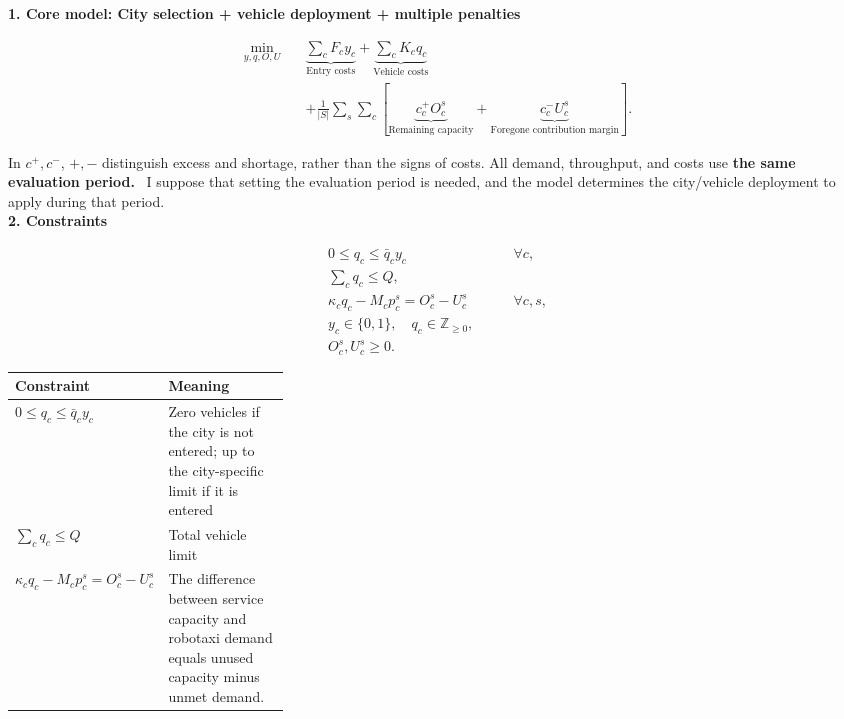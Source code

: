 \documentclass[10pt,a4paper]{article}
\newcommand{\hd}[1]{\par\vspace{8pt}\textbf{#1}\par\vspace{3pt}}
\newcommand{\note}{\textreferencemark\ }
\newcommand{\under}[2]{\underbrace{#1}_{\text{#2}}}
\begin{document}
\hd{1. Core model: City selection + vehicle deployment + multiple penalties}

\[
\boxed{\begin{aligned}
\min_{y,q,O,U}\quad
&\under{\sum_c F_c y_c}{Entry costs}
+\under{\sum_c K_c q_c}{Vehicle costs}\\
&+\frac{1}{|S|}\sum_s\sum_c\left[
\under{c_c^+O_c^s}{Remaining capacity}
+\under{c_c^-U_c^s}{Foregone contribution margin}
\right].
\end{aligned}}
\]


In $c^+,c^-$, $+,-$ distinguish excess and shortage, rather than the signs of costs. All demand, throughput, and costs use \textbf{the same evaluation period.} \note I suppose that setting the evaluation period is needed, and the model determines the city/vehicle deployment to apply during that period. 
\\

\textbf{2. Constraints }

\[
\boxed{\begin{aligned}
0\le q_c\le\bar q_c y_c&\qquad\forall c,\\
\sum_c q_c\le Q,&\\
\kappa_c q_c-M_c p_c^s=O_c^s-U_c^s
&\qquad\forall c,s,\\
y_c\in\{0,1\},\quad q_c\in\mathbb Z_{\ge0},&\\
O_c^s,U_c^s\ge0.&
\end{aligned}}
\]

{\small
\begin{tabularx}{\linewidth}{@{}>{\raggedright\arraybackslash}p{0.32\linewidth}Y@{}}
\toprule
Constraint & Meaning \\ \midrule
$0\le q_c\le\bar q_c y_c$ & Zero vehicles if the city is not entered; up to the city-specific limit if it is entered \\
$\sum_cq_c\le Q$ & Total vehicle limit \\
$\kappa_c q_c-M_c p_c^s=O_c^s-U_c^s$ & The difference between service capacity and robotaxi demand equals unused capacity minus unmet demand. \\

\bottomrule
\end{tabularx}
}
\end{document}
